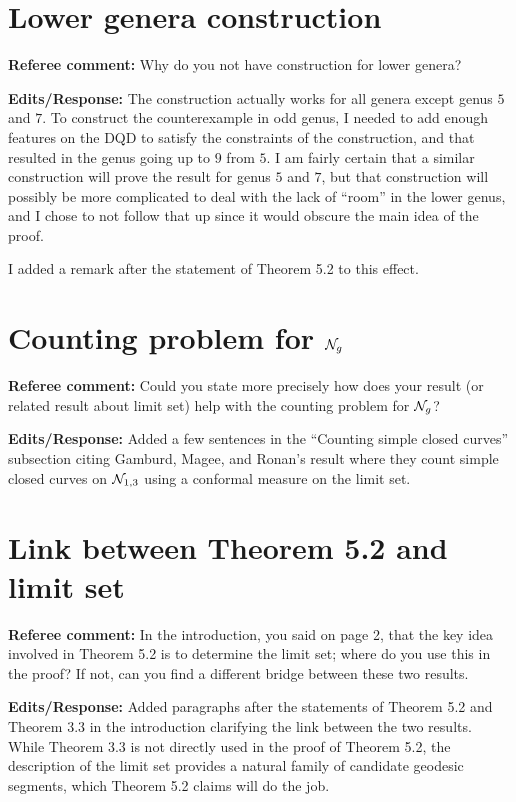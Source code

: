 \documentclass[12pt, reqno]{amsart}
\begin{document}
\section{Lower genera construction}
\label{sec:lower-genera-constr}

\textbf{Referee comment:} Why do you not have construction for lower genera?

\textbf{Edits/Response:} The construction actually works for all genera except genus $5$ and $7$.
To construct the counterexample in odd genus, I needed to add enough features on the DQD to satisfy the constraints of the construction, and that resulted in the genus going up to $9$ from $5$.
I am fairly certain that a similar construction will prove the result for genus $5$ and $7$, but that construction will possibly be more complicated to deal with the lack of ``room'' in the lower genus, and I chose to not follow that up since it would obscure the main idea of the proof.

I added a remark after the statement of Theorem 5.2 to this effect.

\section{Counting problem for $\mathcal{N}_g$}
\label{sec:counting-problem}

\textbf{Referee comment:} Could you state more precisely how does your result (or related result about limit set) help with the counting problem for $\mathcal{N}_g$?

\textbf{Edits/Response:} Added a few sentences in the ``Counting simple closed curves'' subsection citing Gamburd, Magee, and Ronan's result where they count simple closed curves on $\mathcal{N}_{1,3}$ using a conformal measure on the limit set.

\section{Link between Theorem 5.2 and limit set}
\label{sec:link-between-theorem}

\textbf{Referee comment:} In the introduction, you said on page 2, that the key idea involved in Theorem 5.2 is to determine the limit set; where do you use this in the proof? If not, can you find a different bridge between these two results.

\textbf{Edits/Response:} Added paragraphs after the statements of Theorem 5.2 and Theorem 3.3 in the introduction clarifying the link between the two results. While Theorem 3.3 is not directly used in the proof of Theorem 5.2, the description of the limit set provides a natural family of candidate geodesic segments, which Theorem 5.2 claims will do the job.
\end{document}
